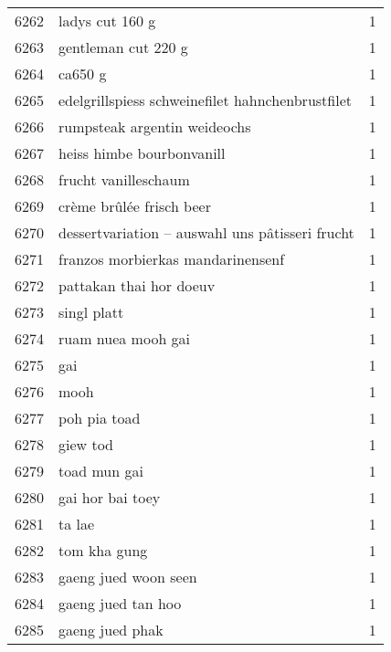 \begin{tabular}{llr}
6262 &                                    ladys cut 160 g &      1 \\
6263 &                                gentleman cut 220 g &      1 \\
6264 &                                            ca650 g &      1 \\
6265 &   edelgrillspiess schweinefilet hahnchenbrustfilet &      1 \\
6266 &                       rumpsteak argentin weideochs &      1 \\
6267 &                          heiss himbe bourbonvanill &      1 \\
6268 &                               frucht vanilleschaum &      1 \\
6269 &                           crème brûlée frisch beer &      1 \\
6270 &    dessertvariation – auswahl uns pâtisseri frucht &      1 \\
6271 &                  franzos morbierkas mandarinensenf &      1 \\
6272 &                            pattakan thai hor doeuv &      1 \\
6273 &                                        singl platt &      1 \\
6274 &                                 ruam nuea mooh gai &      1 \\
6275 &                                                gai &      1 \\
6276 &                                               mooh &      1 \\
6277 &                                       poh pia toad &      1 \\
6278 &                                           giew tod &      1 \\
6279 &                                       toad mun gai &      1 \\
6280 &                                   gai hor bai toey &      1 \\
6281 &                                             ta lae &      1 \\
6282 &                                       tom kha gung &      1 \\
6283 &                               gaeng jued woon seen &      1 \\
6284 &                                 gaeng jued tan hoo &      1 \\
6285 &                                    gaeng jued phak &      1 \\

\end{tabular}
